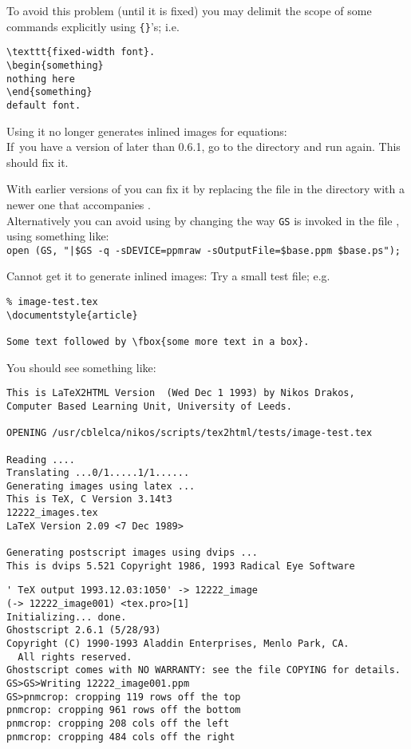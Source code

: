 \begin{htmllist}
To avoid this problem (until it is fixed) you may delimit the scope of
some commands explicitly using \verb|{}|'s; i.e.
\begin{small}
\begin{verbatim}
\texttt{fixed-width font}.
\begin{something}
nothing here
\end{something}
default font.
\end{verbatim}
\end{small}

\item [Using \appl{Ghostscript 3.x} it no
longer generates inlined images for equations:] \hfil\\
If~you have a version of \latextohtml{} later than 0.6.1, go to the
\latextohtml{} directory and run  again.
This should fix it.

With earlier versions of \latextohtml{} you can fix it by
replacing the file  in the
\latextohtml{} directory with a newer one that accompanies
.\\
Alternatively you can avoid using 
by changing the way \texttt{GS} is invoked in the file ,
using something like: \\
\verb/open (GS, "|$GS -q -sDEVICE=ppmraw -sOutputFile=$base.ppm $base.ps");/

\item [Cannot get it to generate inlined images: ]
Try a small test file; e.g.
\begin{small}
\begin{verbatim}
% image-test.tex
\documentstyle{article}

Some text followed by \fbox{some more text in a box}.

\end{verbatim}
\end{small}

You should see something like:
\begin{small}
\begin{verbatim}
This is LaTeX2HTML Version  (Wed Dec 1 1993) by Nikos Drakos,
Computer Based Learning Unit, University of Leeds.

OPENING /usr/cblelca/nikos/scripts/tex2html/tests/image-test.tex

Reading ....
Translating ...0/1.....1/1......
Generating images using latex ...
This is TeX, C Version 3.14t3
12222_images.tex
LaTeX Version 2.09 <7 Dec 1989>

Generating postscript images using dvips ...
This is dvips 5.521 Copyright 1986, 1993 Radical Eye Software
\end{verbatim}
\begin{verbatim}
' TeX output 1993.12.03:1050' -> 12222_image
(-> 12222_image001) <tex.pro>[1]
Initializing... done.
Ghostscript 2.6.1 (5/28/93)
Copyright (C) 1990-1993 Aladdin Enterprises, Menlo Park, CA.
  All rights reserved.
Ghostscript comes with NO WARRANTY: see the file COPYING for details.
GS>GS>Writing 12222_image001.ppm
GS>pnmcrop: cropping 119 rows off the top
pnmcrop: cropping 961 rows off the bottom
pnmcrop: cropping 208 cols off the left
pnmcrop: cropping 484 cols off the right


\end{verbatim}
\end{small}
\end{htmllist}
